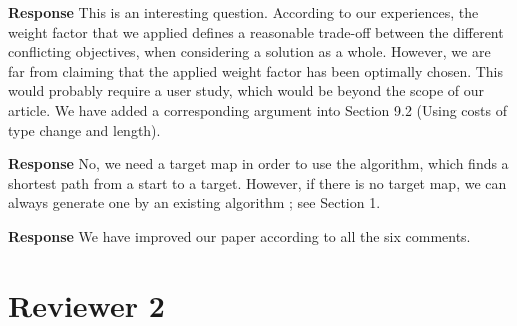 \documentclass[a4paper,twoside,11pt]{reviewresponse}
\begin{document}
\textbf{Response} 
This is an interesting question.
According to our experiences, 
the weight factor that we applied defines a reasonable trade-off 
between the different conflicting objectives, 
when considering a solution as a whole. 
However, we are far from claiming that 
the applied weight factor has been optimally chosen. 
This would probably require a user study, 
which would be beyond the scope of our article.
We have added a corresponding argument into Section 9.2
(Using costs of type change and length).


\textbf{Response} No, we need a target map in order to use the \Astar algorithm,
which finds a shortest path from a start to a target.
However, if there is no target map, we can always generate one 
by an existing algorithm \parencite[e.g.][]{HaunertWolff2010AreaAgg};
see Section 1.



\textbf{Response} We have improved our paper according to all the six comments.

\clearpage

\section{Reviewer 2}
\end{document}
